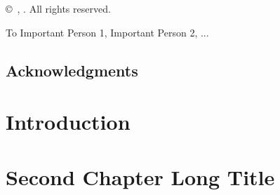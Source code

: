 \documentclass[oneside, 11pt]{amsbook}
\begin{document}

\frontmatter
\pagestyle{prelim}


\newpage

\thispagestyle{empty}
\begin{titlepage}
   \vspace*{50em}
   \begin{center}
      \copyright \ \AuthorName, \GraduationYear. All rights reserved.
   \end{center}
\end{titlepage}
\newpage
{}


\thispagestyle{plain}
\vspace*{20em}
\begin{center}
   To Important Person 1, Important Person 2, ...
\end{center}
\newpage

\doublespacing

\tableofcontents
\newpage


\newpage

\section*{Acknowledgments}

\newpage


\mainmatter
\pagestyle{maintext}

\chapter{Introduction}
\label{ch:IntroductionLabel}


\chapter[Short Title of 2nd Ch.]{Second Chapter Long Title}
\label{ch:2ndChapterLabel}

\end{document}
